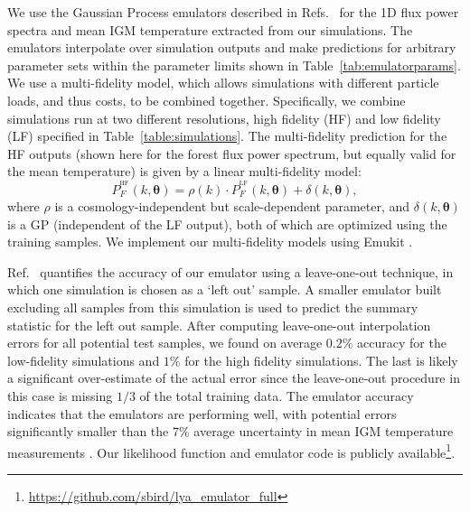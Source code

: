 We use the Gaussian Process emulators described in Refs.~\cite{2022MNRAS.517.3200F, 2023simsuite} for the 1D flux power spectra and mean IGM temperature extracted from our simulations. The emulators interpolate over simulation outputs and make predictions for arbitrary parameter sets within the parameter limits shown in Table~\ref{tab:emulatorparams}. We use a multi-fidelity model, which allows simulations with different particle loads, and thus costs, to be combined together.
Specifically, we combine simulations run at two different resolutions, high fidelity (HF) and low fidelity (LF) specified in Table~\ref{table:simulations}. The multi-fidelity prediction for the HF outputs (shown here for the \lya forest flux power spectrum, but equally valid for the mean temperature) is given by a linear multi-fidelity model:
\begin{equation}
    P_F^{^\mathrm{HF}}(k, \boldsymbol{\theta}) = \rho(k) \cdot P_F^{^\mathrm{LF}}(k, \boldsymbol{\theta}) + \delta(k, \boldsymbol{\theta}),
    \label{eq:ko_model}
\end{equation}
where $\rho$ is a cosmology-independent but scale-dependent parameter, and $\delta(k, \boldsymbol{\theta})$ is a GP (independent of the LF output), both of which are optimized using the training samples.
We implement our multi-fidelity models using Emukit \cite{2021arXiv211013293P}.

Ref.~\cite{2023simsuite} quantifies the accuracy of our emulator using a leave-one-out technique, in which one simulation is chosen as a `left out' sample. A smaller emulator built excluding all samples from this simulation is used to predict the summary statistic for the left out sample. After computing leave-one-out interpolation errors for all potential test samples, we found on average $0.2\%$ accuracy for the low-fidelity simulations and $1\%$ for the high fidelity simulations. The last is likely a significant over-estimate of the actual error since the leave-one-out procedure in this case is missing $1/3$ of the total training data. The emulator accuracy indicates that the emulators are performing well, with potential errors significantly smaller than the 7\% average uncertainty in mean IGM temperature measurements \cite{2019JCAP...07..017C}.
Our likelihood function and emulator code is publicly available\footnote{\url{https://github.com/sbird/lya_emulator_full}}.

